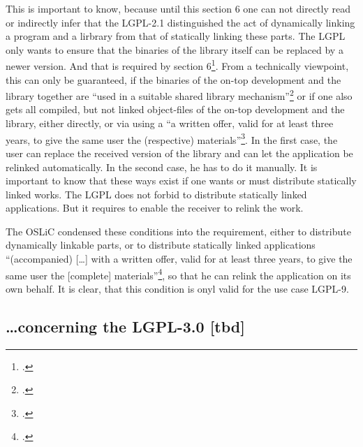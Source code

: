 \begin{itemize}
  This is important to know, because until this section 6 one can not directly
  read or indirectly infer that the LGPL-2.1 distinguished the act of
  dynamically linking a program and a lirbrary from that of statically linking
  these parts. The LGPL only wants to ensure that the binaries of the library
  itself can be replaced by a newer version. And that is required by section
  6\footcite[cf.][\nopage wp.\ §6]{Lgpl21OsiLicense1999a}.
  From a technically viewpoint, this can only be guaranteed, if the binaries of
  the on-top development and the library together are \enquote{used in a
  suitable shared library mechanism}\footcite[cf.][\nopage wp.\
  §6]{Lgpl21OsiLicense1999a} or if one also gets all compiled, but not linked
  object-files of the on-top development and the library, either directly, or
  via using a \enquote{a written offer, valid for at least three years, to give
  the same user the (respective) materials}\footcite[cf.][\nopage wp.\
  §6]{Lgpl21OsiLicense1999a}. In the first case, the user can replace the
  received version of the library and can let the application be relinked
  automatically. In the second case, he has to do it manually. It is important
  to know that these ways exist if one wants or must distribute statically
  linked works. The LGPL does not forbid to distribute statically linked
  applications. But it requires to enable the receiver to relink the work.
  
  The OSLiC condensed these conditions into the requirement, either to
  distribute dynamically linkable parts, or to distribute statically linked
  applications \enquote{(accompanied) [\ldots] with a written offer, valid for
  at least three years, to give the same user the [complete]
  materials}\footcite[cf.][\nopage wp.\ §6]{Lgpl21OsiLicense1999a}, so that he
  can relink the application on its own behalf. It is clear, that this condition
  is onyl valid for the use case LGPL-9.
  

\end{itemize}


\subsection{\ldots concerning the LGPL-3.0 [tbd]}





%
